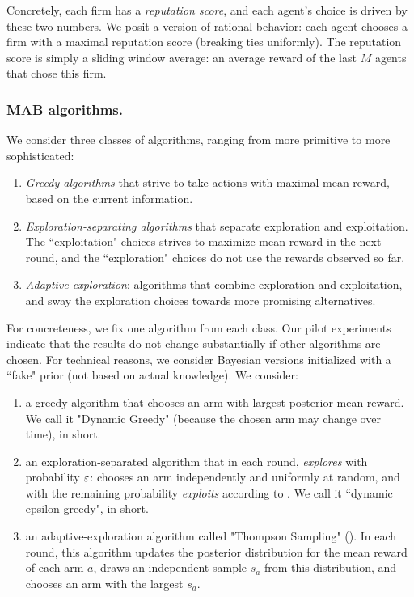 \documentclass[../competing_bandits.tex]{subfiles}
\begin{document}
Concretely, each firm has a \emph{reputation score}, and each agent's choice is driven by these two numbers. We posit a version of rational behavior: each agent chooses a firm with a maximal reputation score (breaking ties uniformly). The reputation score is simply a sliding window average: an average reward of the last $M$ agents that chose this firm.

\subsubsection{MAB algorithms.} We consider three classes of algorithms, ranging from more primitive to more sophisticated: 

\begin{enumerate}
\item \emph{Greedy algorithms} that strive to take actions with maximal mean reward, based on the current information. 
    
\item \emph{Exploration-separating algorithms} that separate exploration and exploitation. The ``exploitation" choices strives to maximize mean reward in the next round, and the ``exploration" choices do not use the rewards observed so far.
\item \emph{Adaptive exploration}: algorithms that combine exploration and exploitation, and sway the exploration choices towards more promising alternatives.
\end{enumerate}

For concreteness, we fix one algorithm from each class. Our pilot experiments indicate that the results do not change substantially if other algorithms are chosen. For technical reasons, we consider Bayesian versions initialized with a ``fake" prior (\ie not based on actual knowledge). We consider: 

\begin{enumerate}
\item a greedy algorithm that chooses an arm with largest posterior mean reward. We call it "Dynamic Greedy" (because the chosen arm may change over time), \DG in short.

\item an exploration-separated algorithm that in each round, \emph{explores} with probability $\varepsilon$: chooses an arm independently and uniformly at random, and with the remaining probability \emph{exploits} according to \DG. We call it ``dynamic epsilon-greedy", \DEG in short.
    
\item an adaptive-exploration algorithm called "Thompson Sampling" (\TS). In each round, this algorithm updates the posterior distribution for the mean reward of each arm $a$, draws an independent sample $s_a$ from this distribution, and chooses an arm with the largest $s_a$.
\end{enumerate}
\end{document}
